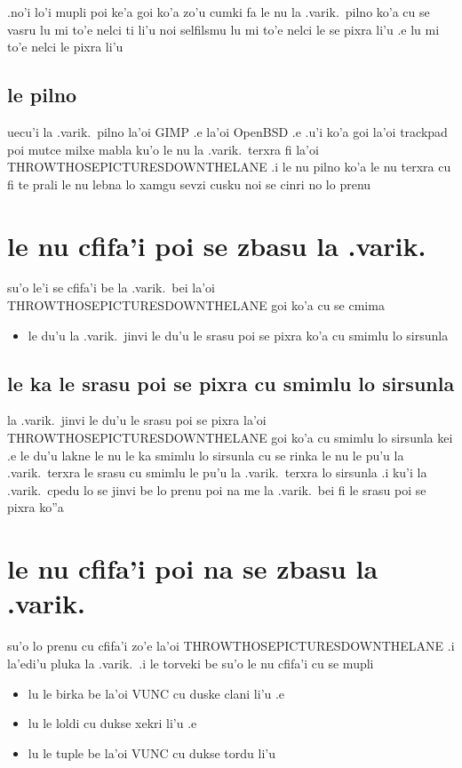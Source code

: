 \documentclass{report}
\begin{document}
.no'i lo'i mupli poi ke'a goi ko'a zo'u cumki fa le nu la .varik.\ pilno ko'a cu se vasru lu mi to'e nelci ti li'u noi selfilsmu lu mi to'e nelci le se pixra li'u .e lu mi to'e nelci le pixra li'u

\subsection{le pilno}
uecu'i la .varik.\ pilno la'oi GIMP .e la'oi OpenBSD .e .u'i ko'a goi la'oi trackpad poi mutce milxe mabla ku'o le nu la .varik.\ terxra fi la'oi THROWTHOSEPICTURESDOWNTHELANE  .i le nu pilno ko'a le nu terxra cu fi te prali le nu lebna lo xamgu sevzi cusku noi se cinri no lo prenu

\section{le nu cfifa'i poi se zbasu la .varik.}
su'o le'i se cfifa'i be la .varik.\ bei la'oi THROWTHOSEPICTURESDOWNTHELANE goi ko'a cu se cmima
\begin{itemize}
	\item le du'u la .varik.\ jinvi le du'u le srasu poi se pixra ko'a cu smimlu lo sirsunla
\end{itemize}

\subsection{le ka le srasu poi se pixra cu smimlu lo sirsunla}
la .varik.\ jinvi le du'u le srasu poi se pixra la'oi THROWTHOSEPICTURESDOWNTHELANE goi ko'a cu smimlu lo sirsunla kei .e le du'u lakne le nu le ka smimlu lo sirsunla cu se rinka le nu le pu'u la .varik.\ terxra le srasu cu smimlu le pu'u la .varik.\ terxra lo sirsunla  .i ku'i la .varik.\ cpedu lo se jinvi be lo prenu poi na me la .varik.\ bei fi le srasu poi se pixra ko''a

\section{le nu cfifa'i poi na se zbasu la .varik.}
su'o lo prenu cu cfifa'i zo'e la'oi THROWTHOSEPICTURESDOWNTHELANE  .i la'edi'u pluka la .varik.\  .i le torveki be su'o le nu cfifa'i cu se mupli
\begin{itemize}
	\item lu le birka be la'oi VUNC cu duske clani li'u .e
	\item lu le loldi cu dukse xekri li'u .e
	\item lu le tuple be la'oi VUNC cu dukse tordu li'u
\end{itemize}
\end{document}
